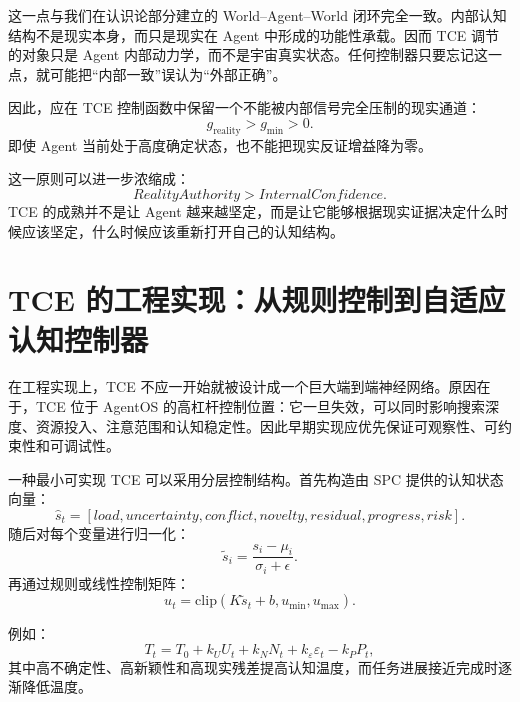 这一点与我们在认识论部分建立的 World--Agent--World 闭环完全一致。内部认知结构不是现实本身，而只是现实在 Agent 中形成的功能性承载。因而 TCE 调节的对象只是 Agent 内部动力学，而不是宇宙真实状态。任何控制器只要忘记这一点，就可能把“内部一致”误认为“外部正确”。

因此，应在 TCE 控制函数中保留一个不能被内部信号完全压制的现实通道：
\begin{equation}
    g_{\mathrm{reality}}>g_{\min}>0.
\end{equation}
即使 Agent 当前处于高度确定状态，也不能把现实反证增益降为零。

这一原则可以进一步浓缩成：
\begin{equation}
    \boxed{
    RealityAuthority
    >
    InternalConfidence.
    }
\end{equation}
TCE 的成熟并不是让 Agent 越来越坚定，而是让它能够根据现实证据决定什么时候应该坚定，什么时候应该重新打开自己的认知结构。

\section{TCE 的工程实现：从规则控制到自适应认知控制器}

在工程实现上，TCE 不应一开始就被设计成一个巨大端到端神经网络。原因在于，TCE 位于 AgentOS 的高杠杆控制位置：它一旦失效，可以同时影响搜索深度、资源投入、注意范围和认知稳定性。因此早期实现应优先保证可观察性、可约束性和可调试性。

一种最小可实现 TCE 可以采用分层控制结构。首先构造由 SPC 提供的认知状态向量：
\begin{equation}
    \hat s_t=
    [
    load,
    uncertainty,
    conflict,
    novelty,
    residual,
    progress,
    risk
    ].
\end{equation}
随后对每个变量进行归一化：
\begin{equation}
    \tilde s_i
    =
    \frac{s_i-\mu_i}{\sigma_i+\epsilon}.
\end{equation}
再通过规则或线性控制矩阵：
\begin{equation}
    u_t
    =
    \mathrm{clip}
    \left(
    K\tilde s_t+b,
    u_{\min},
    u_{\max}
    \right).
\end{equation}

例如：
\begin{equation}
    T_t
    =
    T_0
    +
    k_UU_t
    +
    k_NN_t
    +
    k_\varepsilon\varepsilon_t
    -
    k_PP_t,
\end{equation}
其中高不确定性、高新颖性和高现实残差提高认知温度，而任务进展接近完成时逐渐降低温度。

